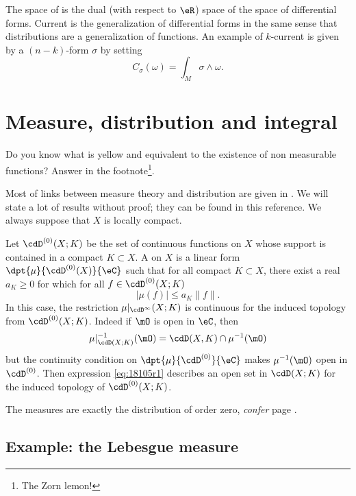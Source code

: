 The space of  is the dual (with respect to $\eR$) space of the space of differential forms. Current is the generalization of differential forms in the same sense that distributions are a generalization of functions. An example of $k$-current is given by a $(n-k)$-form $\sigma$ by setting
\[
  C_{\sigma}(\omega)=\int_M \sigma\wedge\omega.
\]

\section{Measure, distribution and integral} \label{sec_distrib_mesure}

Do you know what is yellow and equivalent to the existence of non measurable functions? Answer in the footnote\footnote{The Zorn lemon!}.

Most of links between measure theory and distribution are given in \cite{Dieu2}. We will state a lot of results without proof; they can be found in this reference. We always suppose that $X$ is locally compact.

Let $\cdD^{(0)}(X;K)$ be the set of continuous functions on $X$ whose support is contained in a compact $K\subset X$. A  on $X$ is a linear form $\dpt{\mu}{\cdD^{(0)}(X)}{\eC}$ such that for all compact $K\subset X$, there exist a real $a_K\geq 0$ for which for all $f\in\cdD^{(0)}(X;K)$
\begin{equation}
  | \mu(f) |\leq a_K\| f \|.
\end{equation}
In this case, the restriction $\mu|_{\cdD^{\infty}}(X;K)$ is continuous for the induced topology from $\cdD^{(0)}(X;K)$. Indeed if $\mO$ is open in $\eC$, then
\begin{equation}  \label{eq:18105r1}
  \mu|_{\cdD(X;K)}^{-1}(\mO)=\cdD(X,K)\cap\mu^{-1}(\mO)
\end{equation}
but the continuity condition on $\dpt{\mu}{\cdD^{(0)}}{\eC}$ makes $\mu^{-1}(\mO)$ open in $\cdD^{(0)}$. Then expression \eqref{eq:18105r1} describes an open set in $\cdD(X;K)$ for the induced topology of $\cdD^{(0)}(X;K)$.

The measures are exactly the distribution of order zero, \emph{confer} page \pageref{pg:reforder}.

\subsection{Example: the Lebesgue measure}

